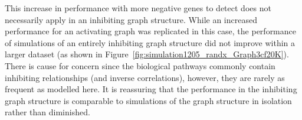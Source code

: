 
This increase in performance with more negative genes to detect does not necessarily apply in an inhibiting \gls{graph} structure. While an increased performance for an activating graph was replicated in this case, the performance of simulations of an entirely inhibiting \gls{graph} structure did not improve within a larger dataset (as shown in Figure~\ref{fig:simulation1205_randx_Graph3cf20K}). There is cause for concern since the biological pathways commonly contain inhibiting relationships (and inverse correlations), however, they are rarely as frequent as modelled here. It is reassuring that the performance in the inhibiting \gls{graph} structure is comparable to simulations of the \gls{graph} structure in isolation rather than diminished.
\iffalse
